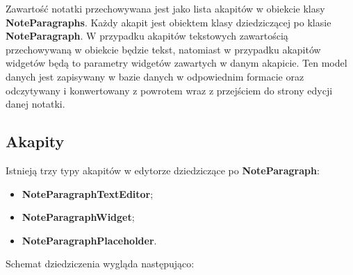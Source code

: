 Zawartość notatki przechowywana jest jako lista akapitów w obiekcie klasy \textbf{NoteParagraphs}. Każdy akapit jest obiektem klasy dziedziczącej po klasie \textbf{NoteParagraph}. W przypadku akapitów tekstowych zawartością przechowywaną w obiekcie będzie tekst, natomiast w przypadku akapitów widgetów będą to parametry widgetów zawartych w danym akapicie. Ten model danych jest zapisywany w bazie danych w odpowiednim formacie oraz odczytywany i konwertowany z powrotem wraz z przejściem do strony edycji danej notatki.

\subsection{Akapity}

Istnieją trzy typy akapitów w edytorze dziedziczące po \textbf{NoteParagraph}: 
\begin{itemize}
    \item \textbf{NoteParagraphTextEditor};
    \item \textbf{NoteParagraphWidget};
    \item \textbf{NoteParagraphPlaceholder}.
\end{itemize}

Schemat dziedziczenia wygląda następująco:







